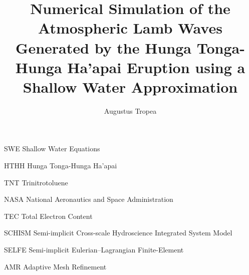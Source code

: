 \documentclass[twoside]{bsu-ms}
\title{Numerical Simulation of the Atmospheric Lamb Waves Generated by the Hunga Tonga-Hunga Ha'apai Eruption using a Shallow Water Approximation}
\author{Augustus Tropea}
\begin{document}
\frontmatter  %

\buildFrontPages %

\begin{listAbbreviations}
	\item[SWE] Shallow Water Equations
	\item[HTHH] Hunga Tonga-Hunga Ha’apai
	\item[TNT] Trinitrotoluene
	\item[NASA] National Aeronautics and Space Administration
	\item[TEC] Total Electron Content
	\item[SCHISM] Semi-implicit Cross-scale Hydroscience Integrated System Model
	\item[SELFE] Semi-implicit Eulerian–Lagrangian Finite-Element
	\item[AMR] Adaptive Mesh Refinement
\end{listAbbreviations}




\mainmatter





\end{document}
